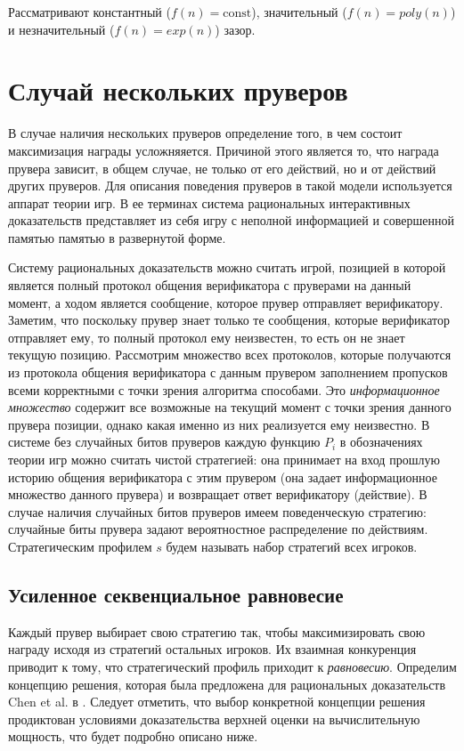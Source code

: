 \documentclass{mipt-thesis-bs}
\theoremstyle{plain}
\theoremstyle{definition}
\begin{document}
    Рассматривают константный ($f(n) = \text{const}$), значительный ($f(n) = \textit{poly}(n)$) и незначительный ($f(n) = \textit{exp}(n)$) зазор.

\chapter{Случай нескольких пруверов}
    В случае наличия нескольких пруверов определение того, в чем состоит максимизация награды усложняяется. Причиной этого является то, что награда прувера зависит, в общем случае, не только от его действий, но и от действий других пруверов. Для описания поведения пруверов в такой модели используется аппарат теории игр. В ее терминах система рациональных интерактивных доказательств представляет из себя игру с неполной информацией и совершенной памятью памятью в развернутой форме.

    Систему рациональных доказательств можно считать игрой, позицией в которой является полный протокол общения верификатора с пруверами на данный момент, а ходом является сообщение, которое прувер отправляет верификатору. Заметим, что поскольку прувер знает только те сообщения, которые верификатор отправляет ему, то полный протокол ему неизвестен, то есть он не знает текущую позицию.
    Рассмотрим множество всех протоколов, которые получаются из протокола общения верификатора с данным прувером заполнением пропусков всеми корректными с точки зрения алгоритма способами.
    Это \textit{информационное множество} содержит все возможные на текущий момент с точки зрения данного прувера позиции, однако какая именно из них реализуется ему неизвестно.
    В системе без случайных битов пруверов каждую функцию $P_i$ в обозначениях теории игр можно считать чистой стратегией: она принимает на вход прошлую историю общения верификатора с этим прувером (она задает информационное множество данного прувера) и возвращает ответ верификатору (действие). В случае наличия случайных битов пруверов имеем поведенческую стратегию: случайные биты прувера задают вероятностное распределение по действиям. Стратегическим профилем $s$ будем называть набор стратегий всех игроков.

\section{Усиленное секвенциальное равновесие}

Каждый прувер выбирает свою стратегию так, чтобы максимизировать свою награду исходя из стратегий остальных игроков.
Их взаимная конкуренция приводит к тому, что стратегический профиль приходит к \textit{равновесию}. Определим концепцию решения, которая была предложена для рациональных доказательств Chen et al. в \cite{chen2017noncoop}.
Следует отметить, что выбор конкретной концепции решения продиктован условиями доказательства верхней оценки на вычислительную мощность, что будет подробно описано ниже.
\end{document}

